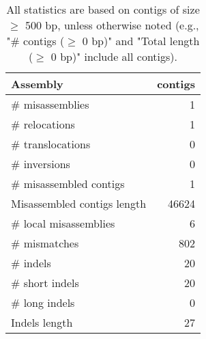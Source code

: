 \documentclass[12pt,a4paper]{article}
\begin{document}
\begin{table}[ht]
\begin{center}
\caption{All statistics are based on contigs of size $\geq$ 500 bp, unless otherwise noted (e.g., "\# contigs ($\geq$ 0 bp)" and "Total length ($\geq$ 0 bp)" include all contigs).}
\begin{tabular}{|l*{1}{|r}|}
\hline
Assembly & contigs \\ \hline
\# misassemblies & 1 \\ \hline
\hspace{5mm}\# relocations & 1 \\ \hline
\hspace{5mm}\# translocations & 0 \\ \hline
\hspace{5mm}\# inversions & 0 \\ \hline
\# misassembled contigs & 1 \\ \hline
Misassembled contigs length & 46624 \\ \hline
\# local misassemblies & 6 \\ \hline
\# mismatches & 802 \\ \hline
\# indels & 20 \\ \hline
\hspace{5mm}\# short indels & 20 \\ \hline
\hspace{5mm}\# long indels & 0 \\ \hline
Indels length & 27 \\ \hline
\end{tabular}
\end{center}
\end{table}
\end{document}
